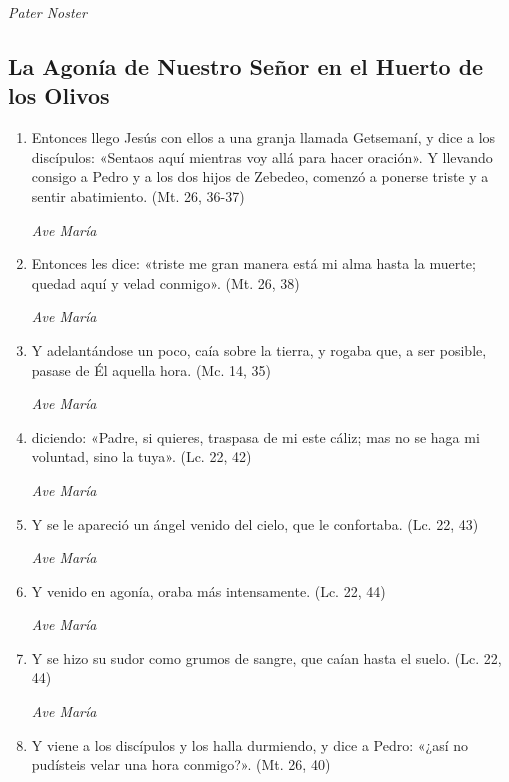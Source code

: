 \documentclass[a4paper,11pt, oneside]{report}
\begin{document}
      \textit{Pater Noster}

      \subsection*{La Agonía de Nuestro Señor en el Huerto de los Olivos}
      
        \begin{enumerate}

          \item Entonces llego Jesús con ellos a una granja llamada Getsemaní, y dice a los discípulos: «Sentaos aquí mientras voy allá para hacer oración». 
          Y llevando consigo a Pedro y a los dos hijos de Zebedeo, comenzó a ponerse triste y a sentir abatimiento. (Mt. 26, 36-37)

          \textit{Ave María}

          \item Entonces les dice: «triste me gran manera está mi alma hasta la muerte; quedad aquí y velad conmigo». (Mt. 26, 38)

          \textit{Ave María}

          \item Y adelantándose un poco, caía sobre la tierra, y rogaba que, a ser posible, pasase de Él aquella hora. (Mc. 14, 35)

          \textit{Ave María}

          \item diciendo: «Padre, si quieres, traspasa de mi este cáliz; mas no se haga mi voluntad, sino la tuya». (Lc. 22, 42)

          \textit{Ave María}

          \item Y se le apareció un ángel venido del cielo, que le confortaba. (Lc. 22, 43)

          \textit{Ave María}

          \item Y venido en agonía, oraba más intensamente. (Lc. 22, 44)

          \textit{Ave María}

          \item Y se hizo su sudor como grumos de sangre, que caían hasta el suelo. (Lc. 22, 44)

          \textit{Ave María}

          \item Y viene a los discípulos y los halla durmiendo, y dice a Pedro: «¿así no pudísteis velar una hora conmigo?». (Mt. 26, 40)


\end{enumerate}
\end{document}

